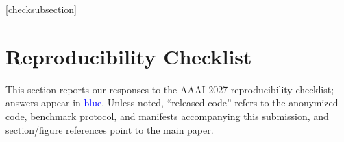 \setlength{\leftmargini}{20pt}
\makeatletter\def\@listi{\leftmargin\leftmargini \topsep .5em \parsep .5em \itemsep .5em}
\def\@listii{\leftmargin\leftmarginii \labelwidth\leftmarginii \advance\labelwidth-\labelsep \topsep .4em \parsep .4em \itemsep .4em}
\def\@listiii{\leftmargin\leftmarginiii \labelwidth\leftmarginiii \advance\labelwidth-\labelsep \topsep .4em \parsep .4em \itemsep .4em}\makeatother

\renewcommand\thesubsection{\arabic{subsection}}
\renewcommand\labelenumi{\thesubsection.\arabic{enumi}}

[checksubsection]
\makeatletter
\newcommand{\checksubsection}[1]{%
  \refstepcounter{checksubsection}%
  \paragraph{\arabic{checksubsection}. #1}%
  \setcounter{checkitem}{0}%
}
\newcommand{\checkitem}{%
  \refstepcounter{checkitem}%
  \item[\arabic{checksubsection}.\arabic{checkitem}.]%
}
\makeatother
\newcommand{\question}[2]{\normalcolor\checkitem #1 #2 \color{blue}}
\newcommand{\ifyespoints}[1]{\makebox[0pt][l]{\hspace{-15pt}\normalcolor #1}}

\section{Reproducibility Checklist}

This section reports our responses to the AAAI-2027 reproducibility checklist;
answers appear in \textcolor{blue}{blue}. Unless noted, ``released code'' refers
to the anonymized code, benchmark protocol, and manifests accompanying this
submission, and section/figure references point to the main paper.

